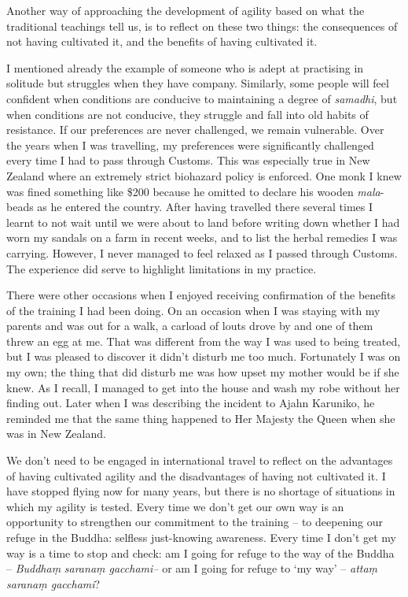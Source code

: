 Another way of approaching the development of agility based on what the
traditional teachings tell us, is to reflect on these two things: the
consequences of not having cultivated it, and the benefits of having
cultivated it.

I mentioned already the example of someone who is adept at practising in
solitude but struggles when they have company. Similarly, some people
will feel confident when conditions are conducive to maintaining a
degree of \emph{samadhi}, but when conditions are not conducive, they
struggle and fall into old habits of resistance. If our preferences are
never challenged, we remain vulnerable. Over the years when I was
travelling, my preferences were significantly challenged every time I
had to pass through Customs. This was especially true in New Zealand
where an extremely strict biohazard policy is enforced. One monk I knew
was fined something like \$200 because he omitted to declare his wooden
\emph{mala}-beads as he entered the country. After having travelled
there several times I learnt to not wait until we were about to land
before writing down whether I had worn my sandals on a farm in recent
weeks, and to list the herbal remedies I was carrying. However, I never
managed to feel relaxed as I passed through Customs. The experience did
serve to highlight limitations in my practice.

There were other occasions when I enjoyed receiving confirmation of the
benefits of the training I had been doing. On an occasion when I was
staying with my parents and was out for a walk, a carload of louts drove
by and one of them threw an egg at me. That was different from the way I
was used to being treated, but I was pleased to discover it didn't
disturb me too much. Fortunately I was on my own; the thing that did
disturb me was how upset my mother would be if she knew. As I recall, I
managed to get into the house and wash my robe without her finding out.
Later when I was describing the incident to Ajahn Karuniko, he reminded
me that the same thing happened to Her Majesty the Queen when she was in
New Zealand.

We don't need to be engaged in international travel to reflect on the
advantages of having cultivated agility and the disadvantages of having
not cultivated it. I have stopped flying now for many years, but there
is no shortage of situations in which my agility is tested. Every time
we don't get our own way is an opportunity to strengthen our commitment
to the training -- to deepening our refuge in the Buddha: selfless
just-knowing awareness. Every time I don't get my way is a time to stop
and check: am I going for refuge to the way of the Buddha --
\emph{Buddhaṃ} \emph{saranaṃ gacchami--} or am I going for refuge to `my
way' -- \emph{attaṃ saranaṃ gacchami}?

